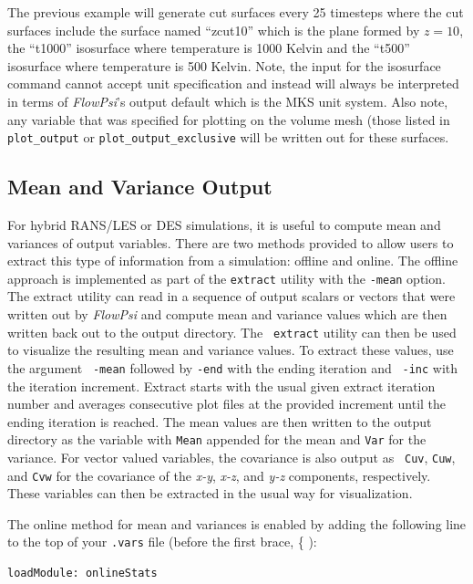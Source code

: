 \documentclass{article}
\begin{document}
The previous example will generate cut surfaces every 25 timesteps
where the cut surfaces include the surface named ``zcut10'' which is
the plane formed by $z=10$, the ``t1000'' isosurface where temperature
is 1000 Kelvin and the ``t500'' isosurface where temperature is 500
Kelvin.  Note, the input for the isosurface command cannot accept unit
specification and instead will always be interpreted in terms of
{\em FlowPsi}'s output default which is the MKS unit system.  Also note, any
variable that was specified for plotting on the volume mesh (those
listed in {\tt plot\_output} or {\tt plot\_output\_exclusive} will be
written out for these surfaces.

\subsection{Mean and Variance Output}

For hybrid RANS/LES or DES simulations, it is useful to compute mean
and variances of output variables.  There are two methods provided to
allow users to extract this type of information from a simulation:
offline and online.  The offline approach is implemented as part of
the {\tt extract} utility with the {\tt -mean} option.  The extract
utility can read in a sequence of output scalars or vectors that were
written out by {\em FlowPsi} and compute mean and variance values
which are then written back out to the output directory.  The {\tt
  extract} utility can then be used to visualize the resulting mean
and variance values.  To extract these values, use the argument {\tt
  -mean} followed by {\tt -end} with the ending iteration and {\tt
  -inc} with the iteration increment.  Extract starts with the usual
given extract iteration number and averages consecutive plot files at
the provided increment until the ending iteration is reached.  The
mean values are then written to the output directory as the variable
with {\tt Mean} appended for the mean and {\tt Var} for the variance.
For vector valued variables, the covariance is also output as {\tt
  Cuv}, {\tt Cuw}, and {\tt Cvw} for the covariance of the {\it x-y},
{\it x-z}, and {\it y-z} components, respectively.  These variables
can then be extracted in the usual way for visualization.

The online method for mean and variances is enabled by adding the
following line to the top of your {\tt .vars} file (before the first brace, \{ ):

\begin{verbatim}
loadModule: onlineStats
\end{verbatim}
\end{document}
